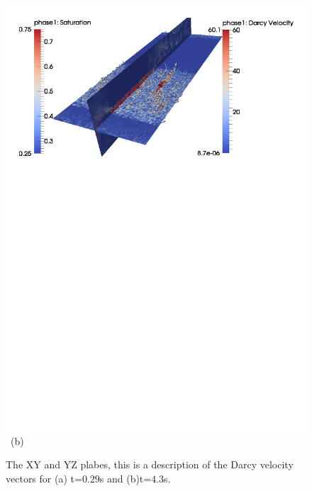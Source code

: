\begin{figure}[ht]
{{\includegraphics[width=1.0\textwidth]{./Pics1/3D_Channel/3D_channel_darcy_vel_planes_490_1.pdf}
}
\vspace{-12.0cm}
\hbox{\hspace{6.0cm} (b)      
}
}     
\caption{The XY and YZ plabes, this is a description of the Darcy velocity vectors for (a) t=$0.29$s and (b)t=$4.3$s.}
\label{fig:3DChannel_planes}
\end{figure}
\clearpage


